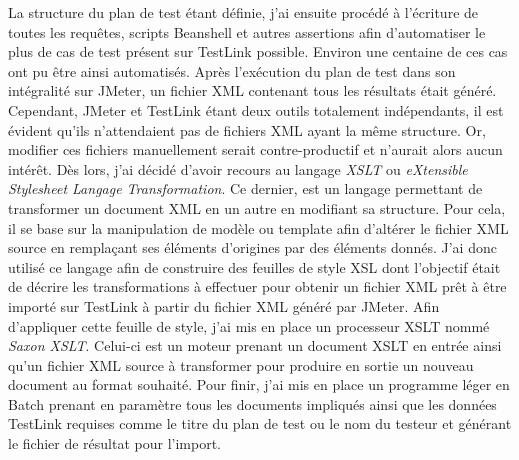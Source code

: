 	La structure du plan de test étant définie, j'ai ensuite procédé à l'écriture de toutes les requêtes, scripts Beanshell et autres assertions afin d'automatiser le plus de cas de test présent sur TestLink possible. Environ une centaine de ces cas ont pu être ainsi automatisés. Après l'exécution du plan de test dans son intégralité sur JMeter, un fichier XML contenant tous les résultats était généré. \\
	
	 Cependant, JMeter et TestLink étant deux outils totalement indépendants, il est évident qu'ils n'attendaient pas de fichiers XML ayant la même structure. Or, modifier ces fichiers manuellement serait contre-productif et n'aurait alors aucun intérêt. Dès lors, j'ai décidé d'avoir recours au langage \textit{XSLT} ou \textit{eXtensible Stylesheet Langage Transformation}. Ce dernier, est un langage permettant de transformer un document XML en un autre en modifiant sa structure. Pour cela, il se base sur la manipulation de modèle ou template afin d'altérer le fichier XML source en remplaçant ses éléments d'origines par des éléments donnés. J'ai donc utilisé ce langage afin de construire des feuilles de style XSL dont l'objectif était de décrire les transformations à effectuer pour obtenir un fichier XML prêt à être importé sur TestLink à partir du fichier XML généré par JMeter. Afin d'appliquer cette feuille de style, j'ai mis en place un processeur XSLT nommé \textit{Saxon XSLT}. Celui-ci est un moteur prenant un document XSLT en entrée ainsi qu'un fichier XML source à transformer pour produire en sortie un nouveau document au format souhaité. Pour finir, j'ai mis en place un programme léger en Batch prenant en paramètre tous les documents impliqués ainsi que les données TestLink requises comme le titre du plan de test ou le nom du testeur et générant le fichier de résultat pour l'import.